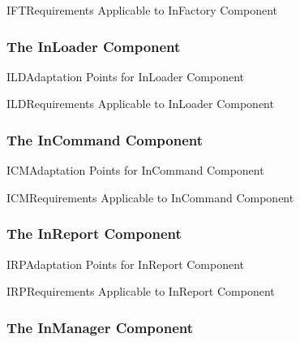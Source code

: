 \documentclass[a4paper,10pt]{article}
\newenvironment{cr_req}[2]
{%
\begin{longtable}{|l|p{9.8cm}|}
\caption{#2} \\
\hline
\rowcolor{light-gray}
\textbf{Req. ID} & \textbf{Requirement Text}\\
\hline\hline
\endfirsthead
\rowcolor{light-gray}
\textbf{Req. ID} & \textbf{Requirement Text}\\
\hline\hline
\endhead
\DTLforeach*[\DTLiseq{\cat}{#1}]{dbReq}{\cat=Category,\type=Type,\id=Id,\reqText=Text}
{\DTLiffirstrow{}{\\\hline}\cat-\id/\type & \textit{\reqText}}\\\hline
}
{\end{longtable}}
\newenvironment{cr_ap}[2]
{%
\begin{longtable}{|l|p{4.7cm}|p{4.9cm}|}
\caption{#2} \\
\hline
\rowcolor{light-gray}
\textbf{AP ID} & \textbf{Adaptation Point} & \textbf{Default Value}\\
\hline\hline
\endfirsthead
\rowcolor{light-gray}
\textbf{AP ID} & \textbf{Adaptation Point} & \textbf{Default Value}\\
\hline\hline
\endhead
\DTLforeach*[\DTLiseq{\cat}{#1}]{dbAP}{\cat=Category,\id=Id,\ap=AP,\defValue=DefValue}
{\DTLiffirstrow{}{\\\hline}\cat-\id & \ap & \defValue}\\\hline
}
{\end{longtable}}
\begin{document}
\begin{cr_req}{IFT}{Requirements Applicable to InFactory Component}
\end{cr_req}


\subsubsection{The InLoader Component}\label{sec:InLoader}


\begin{cr_ap}{ILD}{Adaptation Points for InLoader Component}
\end{cr_ap}

\begin{cr_req}{ILD}{Requirements Applicable to InLoader Component}
\end{cr_req}

\subsubsection{The InCommand Component}\label{sec:InCommand}


\begin{cr_ap}{ICM}{Adaptation Points for InCommand Component}
\end{cr_ap}

\begin{cr_req}{ICM}{Requirements Applicable to InCommand Component}
\end{cr_req}

\subsubsection{The InReport Component}\label{sec:InReport}


\begin{cr_ap}{IRP}{Adaptation Points for InReport Component}
\end{cr_ap}

\begin{cr_req}{IRP}{Requirements Applicable to InReport Component}
\end{cr_req}

\subsubsection{The InManager Component}\label{sec:InManager}

\end{document}
